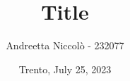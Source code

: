 \author{Andreetta Niccolò - 232077}
\title{Title}
\subtitle{}
\institute{}
\date{Trento, July 25, 2023}
{
\begin{frame}[plain]
    \maketitle
\end{frame}
}